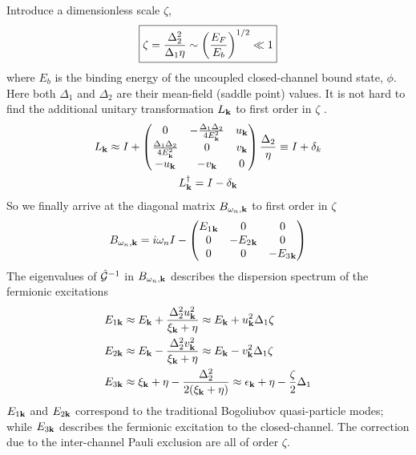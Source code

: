 \documentclass[reprint,pra]{revtex4-1}
\begin{document}
Introduce a dimensionless scale $\zeta$,
\begin{equation}\label{eq:pathInt2:zetaDef}
\boxed{\zeta=\frac{\Delta_{2}^{2}}{\Delta_{1}\eta}\sim\left(\frac{E_{F}}{E_{b}}\right)^{1/2}\ll1}
\end{equation}
where $E_{b}$ is the binding energy of the uncoupled closed-channel bound state, $\phi$.
Here both $\Delta_{1}$ and $\Delta_{2}$ are their mean-field (saddle point) values.  
It is not hard to find  the additional unitary transformation $L_{\mathbf{k}}$ to   first order in $\zeta$ .
\begin{gather}\label{eq:pathInt2:L1}
L_{\mathbf{k}}\approx{}I+
\begin{pmatrix}0&-\frac{\Delta_{1}{}\Delta_{2}{}}{4E^{2}_{\mathbf{k}}}&u_{\mathbf{k}}\\
\frac{\Delta_{1}{}\Delta_{2}{}}{4E^{2}_{\mathbf{k}}}&0&v_{\mathbf{k}}\\
-u_{\mathbf{k}}&-v_{\mathbf{k}}&0
\end{pmatrix}\frac{\Delta_{2}{}}{\eta}
\equiv{}I+\delta_{k}\\
L^{\dagger}_{\mathbf{k}}=I-\delta_{\mathbf{k}}\nonumber
\end{gather}
So we finally arrive at the diagonal matrix $B_{\omega_{n},\mathbf{k}}$ to first order in $\zeta$
\begin{equation}\label{eq:pathInt2:Bapprox}
B_{\omega_{n},\mathbf{k}}=i\omega_{n}I-
	\begin{pmatrix}E_{1}{}_{\mathbf{k}}&0&0\\0&-E_{2}{}_{\mathbf{k}}&0\\0&0&-E_{3}{}_{\mathbf{k}}\end{pmatrix}
\end{equation}
The eigenvalues of $\hat{\mathcal{G}}^{-1}$  in $B_{\omega_{n},\mathbf{k}}$ describes the dispersion spectrum of the  fermionic excitations
\begin{align}\label{eq:pathInt2:xiExpand}
E_{1\mathbf{k}}&\approx{}E_{\mathbf{k}}+\frac{\Delta_{2}^{2}u_{\mathbf{k}}^{2}}{\xi_{\mathbf{k}}+\eta}
\approx{}E_{\mathbf{k}}+u_{\mathbf{k}}^{2}\Delta_{1}\zeta\\
E_{2\mathbf{k}}&\approx{}E_{\mathbf{k}}-\frac{\Delta_{2}^{2}v_{\mathbf{k}}^{2}}{\xi_{\mathbf{k}}+\eta}
\approx{}E_{\mathbf{k}}-v_{\mathbf{k}}^{2}\Delta_{1}\zeta\label{eq:pathInt2:xiExpand2}\\
E_{3\mathbf{k}}&\approx{}\xi_{\mathbf{k}}+\eta-\frac{\Delta_{2}^{2}}{2(\xi_{\mathbf{k}}+\eta)}
\approx{}\epsilon_{\mathbf{k}}+\eta-\frac{\zeta}{2}\Delta_{1}
\label{eq:pathInt2:xiExpand3}
\end{align}
    $E_{1\mathbf{k}}$ and $E_{2\mathbf{k}}$ correspond to the traditional Bogoliubov quasi-particle modes; while $E_{3\mathbf{k}}$ describes the fermionic excitation to the closed-channel.  The correction due to the inter-channel Pauli exclusion are all of order $\zeta$.
\end{document}
